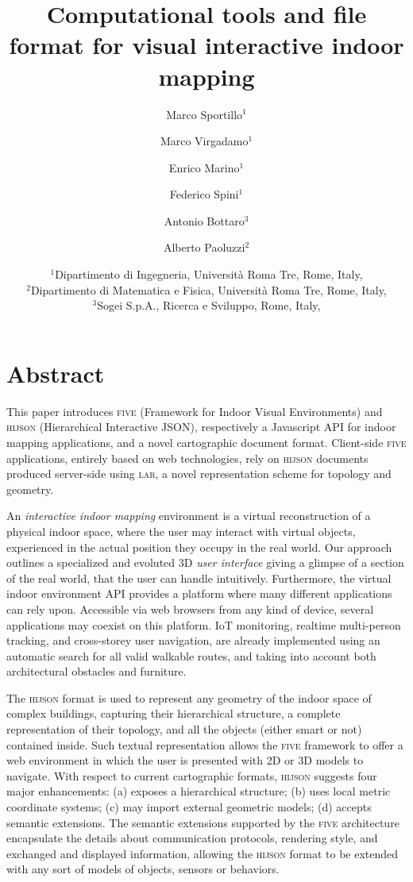 \documentclass[11pt,oneside,A4]{amsart}   	%
\title{Computational tools and file format for visual interactive indoor mapping}
\author{Marco Sportillo$^1$ \and Marco Virgadamo$^1$ \and Enrico Marino$^1$ \and Federico Spini$^1$ \and Antonio Bottaro$^3$ \and Alberto Paoluzzi$^2$}
\date{
$^1$Dipartimento di Ingegneria, Universit\`a Roma Tre, Rome, Italy,  \\
$^2$Dipartimento di Matematica e Fisica, Universit\`a Roma Tre, Rome, Italy,  \\
$^3$Sogei S.p.A., Ricerca e Sviluppo, Rome, Italy, 
}							%
\begin{document}
\maketitle

\section*{Abstract}

This paper introduces \textsc{\large five} (Framework for Indoor Visual Environments) and \textsc{\large hijson} (Hierarchical Interactive JSON), respectively a Javascript API for indoor mapping applications, and a novel cartographic document format. Client-side \textsc{\large five} applications, entirely based on web technologies, rely on \textsc{\large hijson} documents produced server-side using \textsc{\large lar}, a novel representation scheme for topology and geometry.

An \emph{interactive indoor mapping} environment is a virtual reconstruction of a physical indoor space, where the user may interact with virtual objects, experienced in the actual position they occupy in the real world. Our approach outlines a specialized and evoluted  3D \emph{user interface} giving a glimpse of a section of the real world, that the user can handle intuitively.  Furthermore, the virtual indoor environment API provides a platform where many different applications can rely upon. Accessible via web browsers from any kind of device, several applications may coexist on this platform. IoT monitoring, realtime multi-person tracking, and  cross-storey user navigation, are already implemented using an automatic search for all valid walkable routes, and taking into account both architectural obstacles and furniture.

The \textsc{\large hijson} format is used to represent any geometry of the indoor space of complex buildings, capturing their hierarchical structure, a complete representation of their topology, and all the objects (either smart or not) contained inside. Such textual representation allows the \textsc{\large five} framework to offer a web environment in which the user is presented with 2D or 3D models to navigate. With respect to current cartographic formats, \textsc{\large hijson} suggests four major enhancements: (a) exposes a hierarchical structure; (b) uses local metric coordinate systems; (c) may import external geometric models; (d) accepts semantic extensions.
The semantic extensions supported by the \textsc{\large five} architecture encapsulate the details about communication protocols, rendering style, and exchanged and displayed information, allowing the \textsc{\large hijson} format to be extended with any sort of models of objects, sensors or behaviors.
\end{document}
